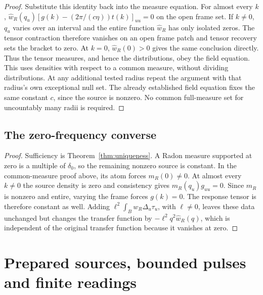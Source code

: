 \documentclass[12pt]{article}
\theoremstyle{definition}
\theoremstyle{remark}
\begin{document}
\begin{proof}
Substitute this identity back into the measure equation. For almost every \(k\),
\(\widehat w_R(q_u)[g(k)-(2\pi/(c\eta))t(k)]_{uu}=0\) on the open frame set.
If \(k\ne0\), \(q_u\) varies over an interval and the entire function
\(\widehat w_R\) has only isolated zeros. The tensor contraction therefore vanishes
on an open frame patch and tensor recovery sets the bracket to zero.
At \(k=0\), \(\widehat w_R(0)>0\) gives the same conclusion directly.
Thus the tensor measures, and hence the distributions, obey the field equation.
This uses densities with respect to a common measure, without dividing distributions.
At any additional tested radius repeat the argument with that radius's own exceptional
null set. The already established field equation fixes the same constant \(c\), since
the source is nonzero. No common full-measure set for uncountably many radii is required.
\end{proof}
\subsection{The zero-frequency converse}
\label{app:cor:spectraliff}
\begin{proof}
Sufficiency is Theorem~\ref{thm:uniqueness}. A Radon measure supported at zero is a
multiple of \(\delta_0\), so the remaining nonzero source is constant. In the
common-measure proof above, its atom forces \(m_R(0)\ne0\). At almost every
\(k\ne0\) the source density is zero and consistency gives
\(m_R(q_u)g_{uu}=0\). Since \(m_R\) is nonzero and entire, varying the frame
forces \(g(k)=0\). The response tensor is therefore constant as well. Adding
\(\ell^2\int_Bw_R\Delta_u\tau_u\), with \(\ell\ne0\), leaves these data unchanged
but changes the transfer function by \(-\ell^2q^2\widehat w_R(q)\), which is
independent of the original transfer function because it vanishes at zero.
\end{proof}
\section{Prepared sources, bounded pulses and finite readings}
\label{app:source-details}
\end{document}

